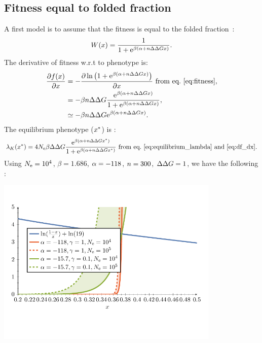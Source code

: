 \subsection{Fitness equal to folded fraction}
\label{subsec:fitness-equal-to-folded-fraction}

A first model is to assume that the fitness is equal to the folded fraction~\citep{Goldstein2013}:
\begin{gather}
 W (x) = \frac{1}{1 + \mathrm{e}^{\beta(\alpha + n \Delta \Delta G x)}}. \label{eq:fitness}
\end{gather}
The derivative of fitness w.r.t to phenotype is:
\begin{align}
\frac{\partial  f (x)}{\partial x}  & = - \frac{\partial \ln \left( 1 + \mathrm{e}^{\beta(\alpha + n \Delta \Delta G x)} \right)}{\partial x} \text{ from eq.~\ref{eq:fitness}}, \\
& = - \beta n \Delta \Delta G \frac{\mathrm{e}^{\beta(\alpha + n \Delta \Delta G x)}}{1 + \mathrm{e}^{\beta(\alpha + n \Delta \Delta G x)}} \label{eq:df_dx},\\
& \simeq - \beta n \Delta \Delta G \mathrm{e}^{\beta(\alpha + n \Delta \Delta G x)}.
\end{align}
The equilibrium phenotype ($x^{*}$) is :
\begin{gather}
\lambda_{K}(x^{*}) = 4N_{\mathrm{e}} \beta \Delta \Delta G \frac{\mathrm{e}^{\beta(\alpha + n \Delta \Delta G x^{*})}}{1 + \mathrm{e}^{\beta(\alpha + n \Delta \Delta G x^{*})}}  \text{ from eq.~\ref{eq:equilibrium_lambda} and~\ref{eq:df_dx}}.
\end{gather}
Using $N_{\mathrm{e}}=10^4$, $\beta=1.686$, $\alpha = -118$, $n=300$, $\Delta \Delta G=1$, we have the following :
\begin{center}
\includegraphics[width=0.8\textwidth, page=4] {analytical-relaxation}
\end{center}
